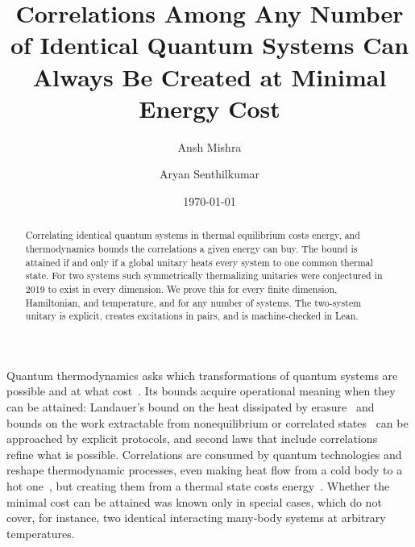 \documentclass[aps,prl,reprint,superscriptaddress,amsmath,amssymb]{revtex4-2}
\begin{document}
\title{Correlations Among Any Number of Identical Quantum Systems Can Always Be Created at Minimal Energy Cost}

\author{Ansh Mishra}
\author{Aryan Senthilkumar}

\date{\today}

\begin{abstract}
Correlating identical quantum systems in thermal equilibrium costs energy, and thermodynamics bounds the correlations a
given energy can buy. The bound is attained if and only if a global unitary heats every system to one common thermal
state. For two systems such symmetrically thermalizing unitaries were conjectured in 2019 to exist in every dimension.
We prove this for every finite dimension, Hamiltonian, and temperature, and for any number of systems. The two-system
unitary is explicit, creates excitations in pairs, and is machine-checked in Lean.
\end{abstract}

\maketitle

Quantum thermodynamics asks which transformations of quantum systems are possible and at what
cost~\cite{HorodeckiOppenheim2013,Brandao2015,Goold2016,Vinjanampathy2016}. Its bounds acquire operational meaning
when they can be attained: Landauer's bound on the heat dissipated by erasure~\cite{Landauer1961,ReebWolf2014} and
bounds on the work extractable from nonequilibrium or correlated states~\cite{Allahverdyan2004,PerarnauLlobet2015} can
be approached by explicit protocols, and second laws that include correlations~\cite{Bera2017} refine what is
possible. Correlations are consumed by quantum technologies and reshape thermodynamic processes, even making heat flow
from a cold body to a hot one~\cite{Micadei2019}, but creating them from a thermal state costs
energy~\cite{Huber2015,Bruschi2015,Vitagliano2018}. Whether the minimal cost can be attained was known only in special
cases, which do not cover, for instance, two identical interacting many-body systems at arbitrary temperatures.
\end{document}
